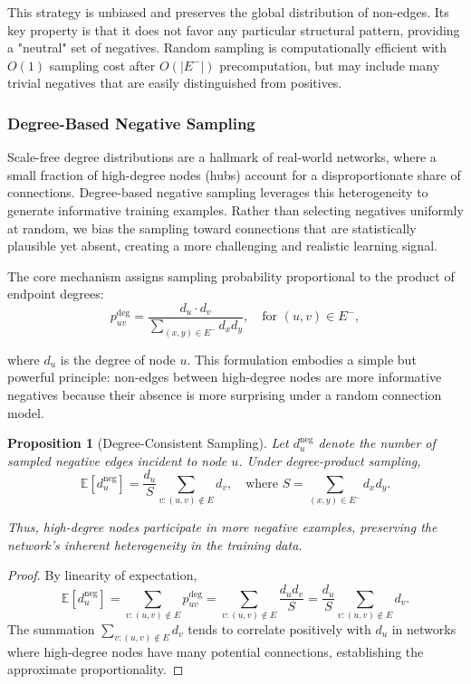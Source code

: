 \documentclass[pdflatex,sn-mathphys-num]{sn-jnl}%
\theoremstyle{thmstyleone}%
\newtheorem{proposition}{Proposition}%
\theoremstyle{thmstyletwo}%
\theoremstyle{thmstylethree}%
\theoremstyle{plain} %
\theoremstyle{definition} %
\theoremstyle{remark} %
\theoremstyle{plain} %
\begin{document}
This strategy is unbiased and preserves the global distribution of non-edges. Its key property is that it does not favor any particular structural pattern, providing a "neutral" set of negatives.
Random sampling is computationally efficient with $O(1)$ sampling cost after $O(|E^-|)$ precomputation, but may include many trivial negatives that are easily distinguished from positives.

\subsubsection{Degree-Based Negative Sampling}

Scale-free degree distributions are a hallmark of real-world networks, where a small fraction of high-degree nodes (hubs) account for a disproportionate share of connections. Degree-based negative sampling leverages this heterogeneity to generate informative training examples. Rather than selecting negatives uniformly at random, we bias the sampling toward connections that are statistically plausible yet absent, creating a more challenging and realistic learning signal.

The core mechanism assigns sampling probability proportional to the product of endpoint degrees:
\begin{equation}
    p_{uv}^{\text{deg}} = \frac{d_u \cdot d_v}{\sum_{(x,y) \in E^-} d_x d_y}, \quad \text{for } (u,v) \in E^-,
\end{equation}


where $d_u$ is the degree of node $u$. This formulation embodies a simple but powerful principle: non-edges between high-degree nodes are more informative negatives because their absence is more surprising under a random connection model.

\begin{proposition}[Degree-Consistent Sampling]
Let $d_u^{\text{neg}}$ denote the number of sampled negative edges incident to node $u$. Under degree-product sampling,
\begin{equation}
  \mathbb{E}[d_u^{\text{neg}}] = \frac{d_u}{S} \sum_{v: (u,v) \notin E} d_v, \quad \text{where } S = \sum_{(x,y) \in E^-} d_x d_y.  
\end{equation}


Thus, high-degree nodes participate in more negative examples, preserving the network's inherent heterogeneity in the training data.
\end{proposition}

\begin{proof}
By linearity of expectation,
\begin{equation}
\mathbb{E}[d_u^{\text{neg}}] = \sum_{v: (u,v) \notin E} p_{uv}^{\text{deg}} = \sum_{v: (u,v) \notin E} \frac{d_u d_v}{S} = \frac{d_u}{S} \sum_{v: (u,v) \notin E} d_v.
\end{equation}
The summation $\sum_{v: (u,v) \notin E} d_v$ tends to correlate positively with $d_u$ in networks where high-degree nodes have many potential connections, establishing the approximate proportionality.
\end{proof}
\end{document}
